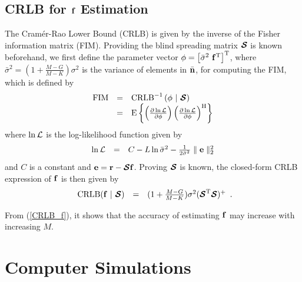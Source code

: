 \documentclass[a4paper,10pt,fleqn, twocolumn]{IEEETran}
\newcommand{\br}{{\mathbf r}}
\newcommand{\bn}{{\bf n}}
\newcommand{\bbf}{{\bf f}}
\newcommand{\bcS}{{\mbox {\boldmath ${\cal S}$}}}
\begin{document}
\subsection{CRLB for $\bbf$ Estimation}
The Cram\'{e}r-Rao Lower Bound (CRLB) is given by the inverse of
the Fisher information matrix (FIM). Providing the blind spreading
matrix $\bcS$ is known beforehand, we first define the parameter
vector $\mathbf{\phi} = \left[\bar{\sigma}^{2}\ \bbf^{\rm
T}\right]^{\rm T}$, where $\bar{\sigma}^{2}
=(1+\frac{M-G}{M-K})\sigma^{2}$ is the variance of elements in
$\bar\bn$, for computing the FIM, which is defined by
\begin{equation}
\begin{array}{rcl}
{\rm FIM}&=&{\rm CRLB}^{-1}\left(\mathbf{\phi}\ |\ \bcS\right)\\
&=& {\rm E} \left\{ \left( \frac{\partial \ln{\cal L}}{\partial
\mathbf{\phi}} \right) \left( \frac{\partial \ln{\cal L}}{\partial
\mathbf{\phi}} \right)^{\rm H} \right\} \label{fim}
\end{array}
\end{equation}
\noindent where $\ln{\cal L}$ is the log-likelihood function given
by
\begin{equation}
\begin{array}{rcl}
\ln{\cal
L}&=&C-L\ln\bar{\sigma}^2-\frac{1}{2\bar{\sigma}^2}\parallel\mathbf{e}\parallel_2^2
\end{array}\label{logl}
\end{equation}
\noindent and $C$ is a constant and $\mathbf{e}=\br-\bcS\bbf$.
Proving $\bcS$ is known, the closed-form CRLB expression of $\bbf$
is then given by
\begin{equation}
\begin{array}{rcl}
{\rm CRLB}(\bbf\ |\ \bcS) &
=&(1+\frac{M-G}{M-K})\sigma^{2}(\bcS^{\rm T}\bcS)^{\rm +}
\end{array}.\label{CRLB_f}
\end{equation}

\noindent From (\ref{CRLB_f}), it shows that the accuracy of
estimating $\bbf$ may increase with increasing $M$.

\section{Computer Simulations}
\end{document}
